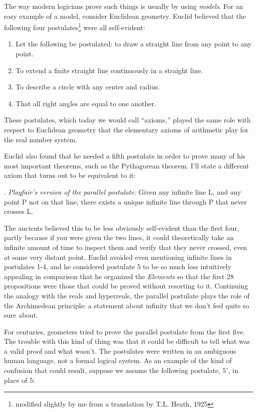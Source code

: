 The way modern logicians prove such things is usually by using \emph{models}.
For an easy example of a model, consider Euclidean geometry. Euclid believed that the following four
postulates\footnote{modified slightly by me from a translation by T.L. Heath, 1925} were all self-evident:

\begin{enumerate}
\item Let the following be postulated: to draw a straight line from any point to any point.
\item To extend a finite straight line continuously in a straight line.
\item To describe a circle with any center and radius.
\item That all right angles are equal to one another.
\end{enumerate}

These postulates, which today we would call ``axioms,'' played the same role with respect to Euclidean geometry that the elementary axioms of arithmetic
play for the real number system.

Euclid also found that he needed a fifth postulate in order to prove many of his most important
theorems, such as the Pythagorean theorem. I'll state a different axiom that turns out to be
equivalent to it:

. \emph{Playfair's version of the parallel postulate:} Given any infinite line L, and any point P not on that line,
there exists a unique infinite line through P that never crosses L.

The ancients believed this to be less obviously self-evident than the first four, partly because
if you were given the two lines, it could theoretically take an infinite amount of time to inspect
them and verify that they never crossed, even at some very distant point. Euclid avoided even mentioning
infinite lines in postulates 1-4, and he considered postulate 5 to be so much less intuitively appealing in comparison that
he organized the \emph{Elements} so that the first 28 propositions were those that could be proved
without resorting to it. Continuing the analogy with the reals and hyperreals, the parallel postulate
plays the role of the Archimedean principle: a statement about infinity that we don't feel quite so sure about.

For centuries, geometers tried to prove the parallel postulate from the first five. The trouble with
this kind of thing was that it could be difficult to tell what was a valid proof and what wasn't.
The postulates were written in an ambiguous human language, not a formal logical system.
As an example of the kind of confusion that could result,
suppose we assume the following postulate, $5'$, in place of 5:

